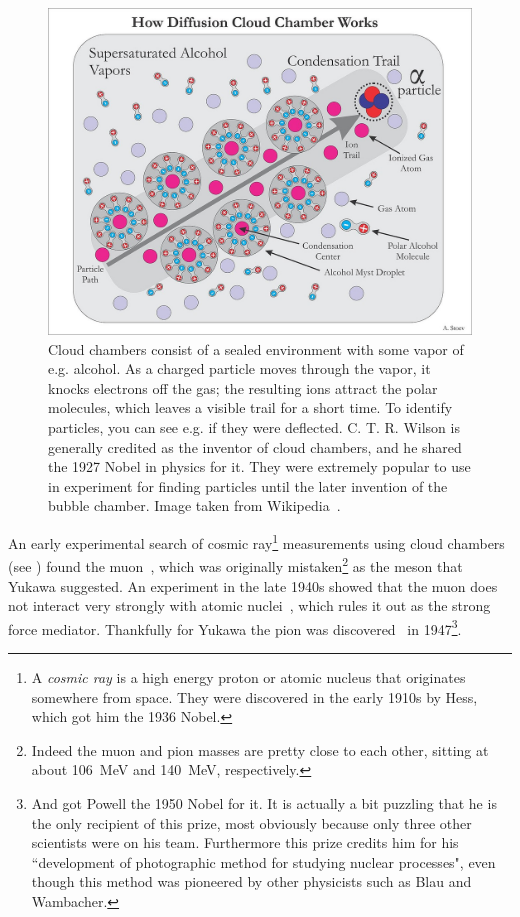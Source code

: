 \begin{figure}
  \centering
  \includegraphics[width=\linewidth]{figs/Diffusion_Cloud_chamber_explained.jpg}
  \caption{Cloud chambers consist of a sealed environment with some vapor
           of e.g. alcohol. As a charged particle moves through the vapor, it knocks
           electrons off the gas; the resulting ions attract the polar molecules,
           which leaves a visible trail for a short time. To identify particles,
           you can see e.g. if they were deflected. C. T. R. Wilson is generally 
           credited as the inventor of cloud chambers, and he shared the 1927 Nobel
           in physics for it. They were extremely popular to use in experiment
           for finding particles until the later invention of the bubble chamber.
           Image taken from Wikipedia~\cite{wiki_cloud}.}
  \label{fig:cloud}
\end{figure}

An early experimental search of cosmic ray\footnote{A {\it cosmic ray} is a high
energy proton or atomic nucleus that originates somewhere from space. They were
discovered in the early 1910s by Hess, which got him the 1936 Nobel.}
 measurements using
cloud chambers (see ) 
found the muon~\cite{neddermeyer_note_1937}, which was originally 
mistaken\footnote{Indeed the muon and pion masses are pretty close to each
other, sitting at about 106~MeV and 140~MeV, respectively.}
as the meson that Yukawa suggested. An experiment in the late 1940s showed that
the muon does not interact very strongly with atomic
nuclei~\cite{conversi_disintegration_1947}, which rules it out as the strong
force mediator. Thankfully for Yukawa the pion was
discovered~\cite{lattes_processes_1947} in 1947\footnote{And got Powell
the 1950 Nobel for it. It is actually a bit puzzling that he is the only
recipient of this prize, most obviously because only three other scientists were
on his team. Furthermore this prize credits him for his ``development of
photographic method for studying nuclear processes", even though this method was
pioneered by other physicists such as Blau and Wambacher.}.

